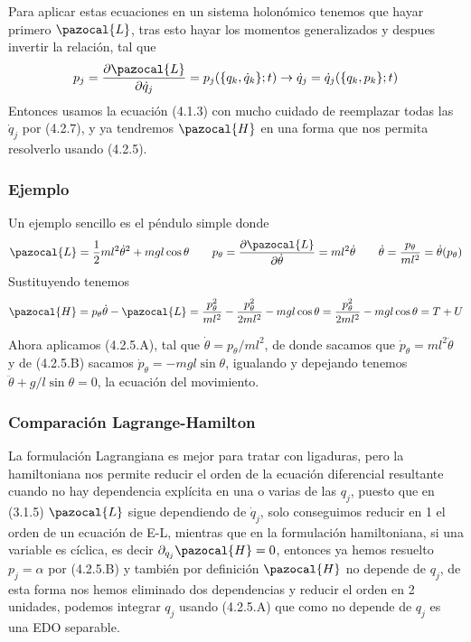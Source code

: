Para aplicar estas ecuaciones en un sistema holonómico tenemos que hayar primero $\pazocal{L}$, tras esto hayar los momentos generalizados y despues invertir la relación, tal que
\begin{equation} \label{4.2.7}
    p_j = \frac{\partial \pazocal{L}}{\partial \dot{q}_j}=p_j(\{q_k,\dot{q}_k\};t) \rightarrow \dot{q}_j = \dot{q}_j(\{q_k,p_k\};t)
\end{equation} 
Entonces usamos la ecuación (4.1.3) con mucho cuidado de reemplazar todas las $\dot{q}_j$ por (4.2.7), y ya tendremos $\pazocal{H}$ en una forma que nos permita resolverlo usando (4.2.5).
\vspace{-20pt}
\subsubsection{Ejemplo}
Un ejemplo sencillo es el péndulo simple donde 
\[\pazocal{L}=\frac{1}{2}ml^2\dot{\theta}^2+mgl\cos{\theta} \ \ \ \ \ \ p_\theta = \frac{\partial \pazocal{L}}{\partial \dot{\theta}}=ml^2\dot{\theta} \ \ \ \ \ \ \dot{\theta}=\frac{p_\theta}{ml^2}=\dot{\theta}(p_\theta)\]
Sustituyendo tenemos 
\[\pazocal{H}=p_\theta \dot{\theta} -\pazocal{L}=\frac{p_\theta^2}{ml^2} - \frac{p_\theta^2}{2ml^2}-mgl\cos\theta = \frac{p_\theta^2}{2ml^2}-mgl\cos\theta = T+U\]

Ahora aplicamos (4.2.5.A), tal que $\dot{\theta} = p_\theta/ml^2$, de donde sacamos que $\dot{p}_\theta=ml^2 \ddot{\theta}$ y de (4.2.5.B) sacamos $\dot{p}_\theta=-mgl\sin\theta$, igualando y depejando tenemos $\ddot{\theta} + g/l \sin\theta = 0$, la ecuación del movimiento.
\subsubsection{Comparación Lagrange-Hamilton}
La formulación Lagrangiana es mejor para tratar con ligaduras, pero la hamiltoniana nos permite reducir el orden de la ecuación diferencial resultante cuando no hay dependencia explícita en una o varias de las $q_j$, puesto que en (3.1.5) $  \pazocal{L}$ sigue dependiendo de $\dot{q}_j$, solo conseguimos reducir en 1 el orden de un ecuación de E-L, mientras que en la formulación hamiltoniana, si una variable es cíclica, es decir $\partial_{q_j}\pazocal{H}=0$, entonces ya hemos resuelto $p_j=\alpha$ por (4.2.5.B) y también por definición $\pazocal{H}$ no depende de $q_j$, de esta forma nos hemos eliminado dos dependencias y reducir el orden en 2 unidades, podemos integrar $q_j$ usando (4.2.5.A) que como no depende de $q_j$ es una EDO separable. 
